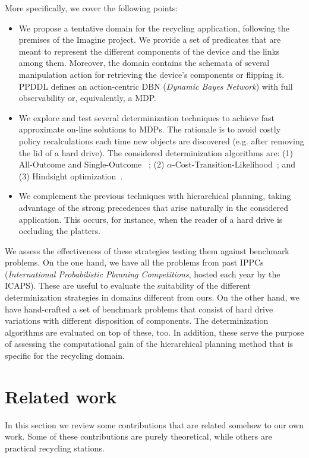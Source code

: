 \documentclass[../root.tex]{subfiles}
\begin{document}
More specifically, we cover the following points:
\begin{itemize}
	\item We propose a tentative domain for the recycling application, following
	the premises of the Imagine project. We provide a set of predicates that are meant to
	represent the different components of
	the device and the links among them. Moreover, the domain contains
	the schemata of several manipulation action for retrieving the device's
	components or flipping it. PPDDL defines an action-centric
	DBN (\emph{Dynamic Bayes Network}) with full observability or, equivalently,
	a MDP.
	\item We explore and test several determinization techniques to achieve fast
	approximate on-line solutions to MDPs. The rationale is to avoid costly policy
	recalculations each time new objects
	are discovered (e.g. after removing the lid of a hard drive). The considered
	determinization algorithms are: (1) All-Outcome and Single-Outcome%
	~\cite{yoon2007ffreplan};
	(2) $ \alpha $-Cost-Transition-Likelihood~\cite{kaelbling2013integrated}; and
	(3) Hindsight optimization~\cite{yoon2008probabilistic,yoon2010improving}.
	\item We complement the previous techniques with hierarchical planning, taking
	advantage of the strong precedences that arise naturally in the
	considered application. This occurs, for instance, when the reader of a hard
	drive is occluding the platters.
\end{itemize}

We assess the effectiveness of these strategies testing them against
benchmark problems. On the one hand, we have all the problems from past
IPPCs
(\emph{International Probabilistic Planning Competitions}, hosted
each year by the ICAPS). These are useful to evaluate the suitability of
the different
determinization strategies in domains different from ours. On the other hand,
we have hand-crafted a set of benchmark problems that consist of
hard drive variations with different disposition of components. The determinization
algorithms are evaluated on top of these, too. In addition, these serve
the purpose of assessing the computational gain of the hierarchical planning
method that is specific for the recycling domain.

\section{Related work}

In this section we review some contributions that are related
somehow to our own work. Some of these contributions are purely
theoretical, while others are practical recycling stations.
\end{document}
